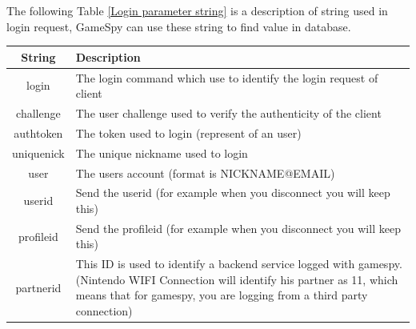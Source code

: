 \documentclass[oneside,titlepage,a4paper]{report} %
\begin{document}
The following Table \ref{Login parameter string} is a description of string used in login request, GameSpy can use these string to find value in database.
\begin{table}[H]
	\centering
	\begin{tabular}{|c|>{\centering\arraybackslash}p{9cm}|}
		\hline
		  String    & Description                                                                                                                                                                                               \\ \hline
		 login& The login command which use to identify the login request of client\\ \hline
		 challenge  & The user challenge used to verify the authenticity of the client                                                                                                                                          \\ \hline
		 authtoken  & The token used to login (represent of an user)                                                                                                                                                            \\ \hline
		uniquenick  & The unique nickname used to login                                                                                                                                                                         \\ \hline
		   user     & The users account (format is NICKNAME@EMAIL)                                                                                                                                                              \\ \hline
		  userid    & Send the userid (for example when you disconnect you will keep this)                                                                                                                                      \\ \hline
		 profileid  & Send the profileid (for example when you disconnect you will keep this)                                                                                                                                   \\ \hline
		 partnerid  & This ID is used to identify a backend service logged with gamespy.(Nintendo WIFI Connection will identify his partner as 11, which means that for gamespy, you are logging from a third party connection) \\ \hline

\end{tabular}
\end{table}
\end{document}
